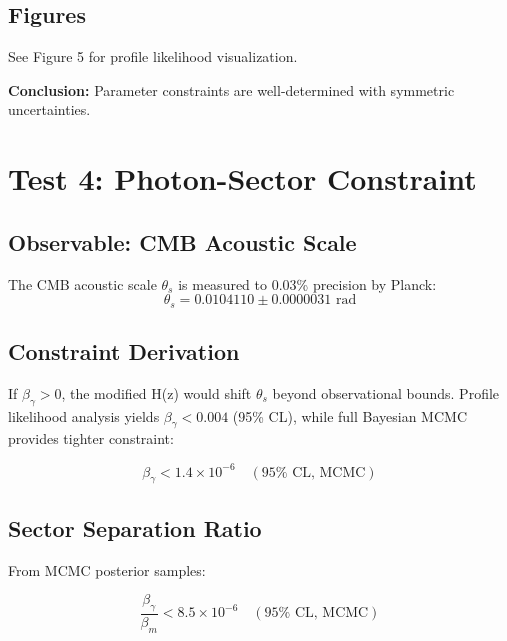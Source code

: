 \documentclass[11pt,letterpaper]{article}
\begin{document}
\subsection{Figures}

See Figure 5 for profile likelihood visualization.

\noindent\textbf{Conclusion:} Parameter constraints are well-determined with symmetric uncertainties.

\section{Test 4: Photon-Sector Constraint}

\subsection{Observable: CMB Acoustic Scale}

The CMB acoustic scale $\theta_s$ is measured to 0.03\% precision by Planck:
\begin{equation}
\theta_s = 0.0104110 \pm 0.0000031 \text{ rad}
\end{equation}

\subsection{Constraint Derivation}

If $\beta_\gamma > 0$, the modified H(z) would shift $\theta_s$ beyond observational bounds. Profile likelihood analysis yields $\beta_\gamma < 0.004$ (95\% CL), while full Bayesian MCMC provides tighter constraint:

\begin{equation}
\beta_\gamma < 1.4 \times 10^{-6} \quad (95\% \text{ CL, MCMC})
\end{equation}

\subsection{Sector Separation Ratio}

From MCMC posterior samples:

\begin{equation}
\frac{\beta_\gamma}{\beta_m} < 8.5 \times 10^{-6} \quad (95\% \text{ CL, MCMC})
\end{equation}
\end{document}
